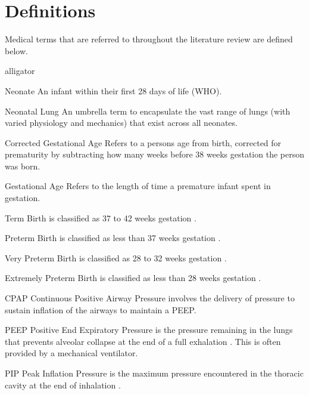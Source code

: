 \documentclass[12pt, openany, oneside]{book}
\begin{document}
\section{Definitions}
Medical terms that are referred to throughout the literature review are defined below.

\begin{labeling}{alligator}


\item[Neonate] An infant within their first 28 days of life (WHO).

\item[Neonatal Lung] An umbrella term to encapsulate the vast range of lungs (with varied physiology and mechanics) that exist across all neonates.

\item[Corrected Gestational Age] Refers to a persons age from birth, corrected for prematurity by subtracting how many weeks before 38 weeks gestation the person was born.

\item [Gestational Age] Refers to the length of time a premature infant spent in gestation.

\item [Term Birth] is classified as 37 to 42 weeks gestation \citep{glass2015outcomes}.

\item [Preterm Birth] is classified as less than 37 weeks gestation \citep{glass2015outcomes}.

\item[Very Preterm Birth] is classified as 28 to 32 weeks gestation \citep{glass2015outcomes}.

\item [Extremely Preterm Birth] is classified as less than 28 weeks gestation \citep{glass2015outcomes}.

\item[CPAP] Continuous Positive Airway Pressure involves the delivery of pressure to sustain inflation of the airways to maintain a PEEP.

\item[PEEP] Positive End Expiratory Pressure is the pressure remaining in the lungs that prevents alveolar collapse at the end of a full exhalation \citep{sail}. This is often provided by a mechanical ventilator.

\item[PIP] Peak Inflation Pressure is the maximum pressure encountered in the thoracic cavity at the end of inhalation \citep{sail}.


\end{labeling}
\end{document}
